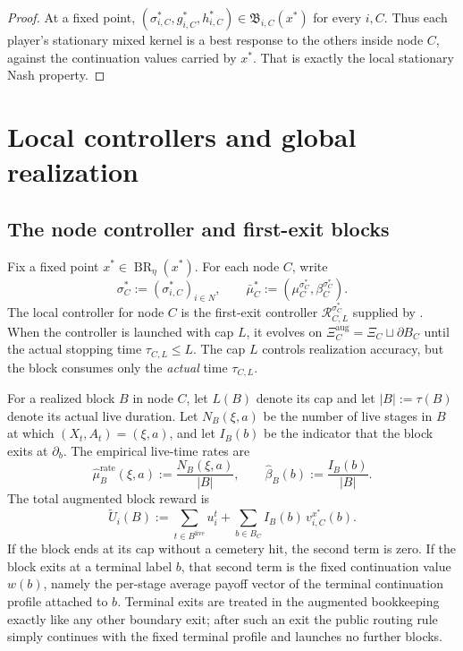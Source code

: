 \documentclass[12pt]{article}
\theoremstyle{definition}
\newcommand{\1}{\mathbf{1}}
\DeclareMathOperator{\BR}{BR}
\begin{document}
\begin{proof}
At a fixed point,
$(\sigma_{i,C}^*,g_{i,C}^*,h_{i,C}^*)\in\mathfrak B_{i,C}(x^*)$ for every $i,C$.
Thus each player's stationary mixed kernel is a best response to the others inside
node $C$, against the continuation values carried by $x^*$. That is exactly the
local stationary Nash property.
\end{proof}

\section{Local controllers and global realization}
\label{sec:realization}


\subsection{The node controller and first-exit blocks}

Fix a fixed point $x^*\in\BR_\eta(x^*)$. For each node $C$, write
\[
\sigma_C^*:=(\sigma_{i,C}^*)_{i\in N},
\qquad
\bar\mu_C^*:=(\mu_C^{\sigma_C^*},\beta_C^{\sigma_C^*}).
\]
The local controller for node $C$ is the first-exit controller
$\mathcal R_{C,L}^{\sigma_C^*}$ supplied by . When the
controller is launched with cap $L$, it evolves on
$\Xi_C^{\mathrm{aug}}=\Xi_C\sqcup\partial B_C$ until the actual stopping time
$\tau_{C,L}\le L$. The cap $L$ controls realization accuracy, but the block
consumes only the \emph{actual} time $\tau_{C,L}$.

For a realized block $B$ in node $C$, let $L(B)$ denote its cap and let
$|B|:=\tau(B)$ denote its actual live duration. Let
$N_B(\xi,a)$ be the number of live stages in $B$ at which $(X_t,A_t)=(\xi,a)$, and
let $I_B(b)$ be the indicator that the block exits at $\partial_b$. The empirical
live-time rates are
\[
\widehat\mu_B^{\mathrm{rate}}(\xi,a):=\frac{N_B(\xi,a)}{|B|},
\qquad
\widehat\beta_B(b):=\frac{I_B(b)}{|B|}.
\]
The total augmented block reward is
\begin{equation}
\label{eq:aug-block-payoff}
\widetilde U_i(B)
:=
\sum_{t\in B^{\mathrm{live}}} u_i^t
+
\sum_{b\in B_C}I_B(b)\,v_{i,C}^{x^*}(b).
\end{equation}
If the block ends at its cap without a cemetery hit, the second term is zero.
If the block exits at a terminal label $b$, that second term is the fixed
continuation value $w(b)$, namely the per-stage average payoff vector of the
terminal continuation profile attached to $b$. Terminal exits are treated in
the augmented bookkeeping exactly like any other boundary exit; after such an
exit the public routing rule simply continues with the fixed terminal profile
and launches no further blocks.
\end{document}
